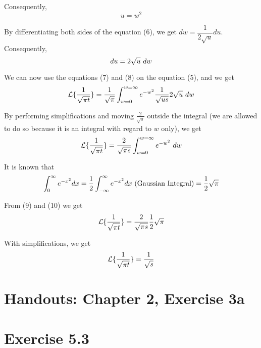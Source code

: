 \documentclass[notitlepage,12pt]{article}
\begin{document}
	Consequently,
	\begin{equation}u = w^2 \end{equation}
	
	By differentiating both sides of the equation (6), we get $dw = \dfrac{1}{2\sqrt{u}}du$. Consequently,
	\begin{equation}du = 2\sqrt{u} \textnormal{ } dw \end{equation}
	
	We can now use the equations (7) and (8) on the equation (5), and we get
	\begin{equation*} 
	\mathcal{L} \{ \frac{1}{\sqrt{\pi t}}\} = \frac{1}{\sqrt{\pi}} \int_{w=0}^{w=\infty} e^{-w^2} \frac{1}{\sqrt{us}} 2\sqrt{u} \textnormal{ } dw 
	\end{equation*}
	
	By performing simplifications and moving $\frac{2}{\sqrt{s}}$ outside the integral (we are allowed to do so because it is an integral with regard to $w$ only), we get
	\begin{equation} 
	\mathcal{L} \{ \frac{1}{\sqrt{\pi t}}\} = \frac{2}{\sqrt{\pi s}} \int_{w=0}^{w=\infty} e^{-w^2} \textnormal{ } dw 
	\end{equation}
	
	It is known that 
	\begin{equation} 
	\int_{0}^{\infty}e^{-x^2}dx = \frac{1}{2} \int_{-\infty}^{\infty}e^{-x^2}dx \textnormal{ (Gaussian Integral)} = \frac{1}{2} \sqrt{\pi}
	\end{equation}
	
	From (9) and (10) we get
	\begin{equation*} 
	\mathcal{L} \{ \frac{1}{\sqrt{\pi t}}\} = \frac{2}{\sqrt{\pi s}} \frac{1}{2} \sqrt{\pi}
	\end{equation*}
	
	With simplifications, we get
	\begin{equation*} 
	\mathcal{L} \{ \frac{1}{\sqrt{\pi t}}\} = \frac{1}{\sqrt{s}}
	\end{equation*}
	
	
	
	\section*{Handouts: Chapter 2, Exercise 3a}
	
	
	
	\section*{Exercise 5.3}
	
	\begin{verse}
		\textsl{}
	\end{verse}
	
	\begin{lstlisting}
	
	\end{lstlisting}
	
\end{document}
